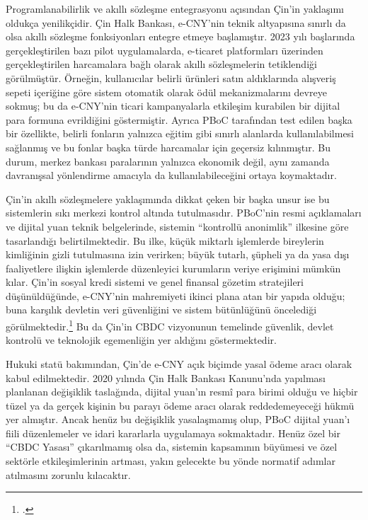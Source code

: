 \documentclass[a4paper,12pt]{article}
\begin{document}
Programlanabilirlik ve akıllı sözleşme entegrasyonu açısından Çin’in yaklaşımı oldukça yenilikçidir. Çin Halk Bankası, e-CNY'nin teknik altyapısına sınırlı da olsa akıllı sözleşme fonksiyonları entegre etmeye başlamıştır. 2023 yılı başlarında gerçekleştirilen bazı pilot uygulamalarda, e-ticaret platformları üzerinden gerçekleştirilen harcamalara bağlı olarak akıllı sözleşmelerin tetiklendiği görülmüştür. Örneğin, kullanıcılar belirli ürünleri satın aldıklarında alışveriş sepeti içeriğine göre sistem otomatik olarak ödül mekanizmalarını devreye sokmuş; bu da e-CNY'nin ticari kampanyalarla etkileşim kurabilen bir dijital para formuna evrildiğini göstermiştir. Ayrıca PBoC tarafından test edilen başka bir özellikte, belirli fonların yalnızca eğitim gibi sınırlı alanlarda kullanılabilmesi sağlanmış ve bu fonlar başka türde harcamalar için geçersiz kılınmıştır. Bu durum, merkez bankası paralarının yalnızca ekonomik değil, aynı zamanda davranışsal yönlendirme amacıyla da kullanılabileceğini ortaya koymaktadır.

Çin'in akıllı sözleşmelere yaklaşımında dikkat çeken bir başka unsur ise bu sistemlerin sıkı merkezi kontrol altında tutulmasıdır. PBoC’nin resmi açıklamaları ve dijital yuan teknik belgelerinde, sistemin “kontrollü anonimlik” ilkesine göre tasarlandığı belirtilmektedir. Bu ilke, küçük miktarlı işlemlerde bireylerin kimliğinin gizli tutulmasına izin verirken; büyük tutarlı, şüpheli ya da yasa dışı faaliyetlere ilişkin işlemlerde düzenleyici kurumların veriye erişimini mümkün kılar. Çin’in sosyal kredi sistemi ve genel finansal gözetim stratejileri düşünüldüğünde, e-CNY’nin mahremiyeti ikinci plana atan bir yapıda olduğu; buna karşılık devletin veri güvenliğini ve sistem bütünlüğünü öncelediği görülmektedir.\footcite{liu2022regulatory} Bu da Çin’in CBDC vizyonunun temelinde güvenlik, devlet kontrolü ve teknolojik egemenliğin yer aldığını göstermektedir.

Hukuki statü bakımından, Çin'de e-CNY açık biçimde yasal ödeme aracı olarak kabul edilmektedir. 2020 yılında Çin Halk Bankası Kanunu'nda yapılması planlanan değişiklik taslağında, dijital yuan’ın resmî para birimi olduğu ve hiçbir tüzel ya da gerçek kişinin bu parayı ödeme aracı olarak reddedemeyeceği hükmü yer almıştır. Ancak henüz bu değişiklik yasalaşmamış olup, PBoC dijital yuan'ı fiili düzenlemeler ve idari kararlarla uygulamaya sokmaktadır. Henüz özel bir “CBDC Yasası” çıkarılmamış olsa da, sistemin kapsamının büyümesi ve özel sektörle etkileşimlerinin artması, yakın gelecekte bu yönde normatif adımlar atılmasını zorunlu kılacaktır.
\end{document}

